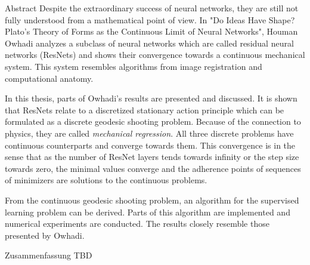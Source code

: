 \begin{polyabstract}{Abstract} 
	Despite the extraordinary success of neural networks, they are still not fully understood from a mathematical point of view.
	In "Do Ideas Have Shape? Plato's Theory of Forms as the Continuous Limit of Neural Networks", Houman Owhadi analyzes a subclass of neural networks which are called residual neural networks (ResNets) and shows their convergence towards a continuous mechanical system.
	This system resembles algorithms from image registration and computational anatomy.
	
	In this thesis, parts of Owhadi's results are presented and discussed.
	It is shown that ResNets relate to a discretized stationary action principle which can be formulated as a discrete geodesic shooting problem.
	Because of the connection to physics, they are called \emph{mechanical regression}.
	All three discrete problems have continuous counterparts and converge towards them.
	This convergence is in the sense that as the number of ResNet layers tends towards infinity or the step size towards zero, the minimal values converge and the adherence points of sequences of minimizers are solutions to the continuous problems.
	
	From the continuous geodesic shooting problem, an algorithm for the supervised learning problem can be derived.
	Parts of this algorithm are implemented and numerical experiments are conducted.
	The results closely resemble those presented by Owhadi.	
\end{polyabstract}

\pagebreak
\begin{polyabstract}{Zusammenfassung}
	TBD
\end{polyabstract}
